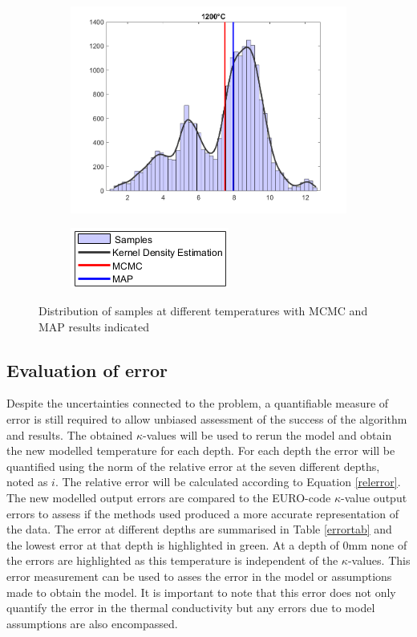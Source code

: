 \begin{figure}[b]
\begin{subfigure}{}
	\end{subfigure}
	\begin{subfigure}{}
	\centering
	\includegraphics[width = 0.45\linewidth]{figures/histograph/histo8.png}
	\end{subfigure}
	\centering
	\begin{subfigure}{}
	\includegraphics[width = 0.3\linewidth]{figures/histograph/legend.png}
	\end{subfigure}
	\caption[short]{Distribution of samples at different temperatures with MCMC and MAP results indicated}
\end{figure}

\subsection{Evaluation of error}
Despite the uncertainties connected to the problem, a quantifiable measure of error is still required to allow unbiased assessment of the success of the algorithm and results.
The obtained $\kappa$-values will be used to rerun the model and obtain the new modelled temperature for each depth. 
For each depth the error will be quantified using the norm of the relative error at the seven different depths, noted as $i$.
The relative error will be calculated according to  Equation \ref{relerror}. 
The new modelled output errors are compared to the EURO-code $\kappa$-value output errors to assess if the methods used produced a more accurate representation of the data.
The error at different depths are summarised in Table \ref{errortab} and the lowest error at that depth is highlighted in green. 
At a depth of 0mm none of the errors are highlighted as this temperature is independent of the $\kappa$-values.
This error measurement can be used to asses the error in the model or assumptions made to obtain the model.
It is important to note that this error does not only quantify the error in the thermal conductivity but any errors due to model assumptions are also encompassed.

